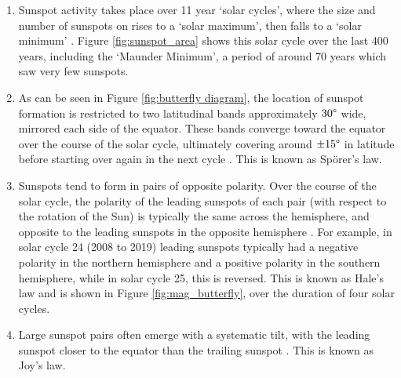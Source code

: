 \documentclass[11pt,a4paper,onecolumn]{report}
\begin{document}
\begin{enumerate}
  \item Sunspot activity takes place over 11 year `solar cycles', where the size
  and number of sunspots on rises to a `solar maximum', then falls to a `solar
  minimum' \citep{schwabe_astronomische_1844}. Figure \ref{fig:sunspot_area}
  shows this solar cycle over the last 400 years, including the `Maunder
  Minimum', a period of around 70 years which saw very few sunspots.

  \item As can be seen in Figure \ref{fig:butterfly diagram}, the location of sunspot
  formation is restricted to two latitudinal bands approximately \(30\degree\)
  wide, mirrored each side of the equator. These bands converge toward the equator
  over the course of the solar cycle, ultimately covering around \(\pm 15\degree\)
  in latitude before starting over again in the next cycle
  \citep{carrington_observations_1863}. This is known as Sp\"orer's law.

  \item Sunspots tend to form in pairs of opposite polarity. Over the course of the
  solar cycle, the polarity of the leading sunspots of each pair (with respect
  to the rotation of the Sun) is typically the same across the hemisphere, and
  opposite to the leading sunspots in the opposite hemisphere
  \citep{hale_law_1925}. For example, in solar cycle 24 (2008 to 2019) leading
  sunspots typically had a negative polarity in the northern hemisphere and a
  positive polarity in the southern hemisphere, while in solar cycle 25, this is
  reversed. This is known as Hale's law and is shown in Figure
  \ref{fig:mag_butterfly}, over the duration of four solar cycles.

  \item Large sunspot pairs often emerge with a systematic tilt, with the
  leading sunspot closer to the equator than the trailing sunspot
  \citep{hale_magnetic_1919}. This is known as Joy's law.
\end{enumerate}
\end{document}
